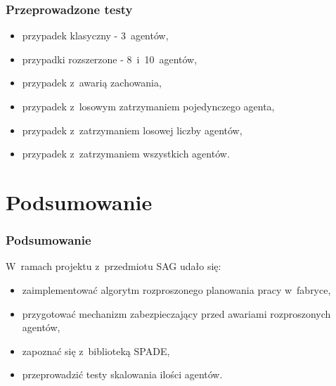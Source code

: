 \documentclass{beamer}
\begin{document}
\begin{frame}
    \frametitle{Przeprowadzone testy}
    \begin{itemize}
        \item przypadek klasyczny - 3~agentów,
        \item przypadki rozszerzone - 8~i~10~agentów,
        \item przypadek z~awarią zachowania,
        \item przypadek z~losowym zatrzymaniem pojedynczego agenta,
        \item przypadek z~zatrzymaniem losowej liczby agentów,
        \item przypadek z~zatrzymaniem wszystkich agentów.
    \end{itemize}
\end{frame}

\section{Podsumowanie}
\begin{frame}
    \frametitle{Podsumowanie}
    W~ramach projektu z~przedmiotu SAG udało się:
    \begin{itemize}
        \item zaimplementować algorytm rozproszonego planowania pracy w~fabryce,
        \item przygotować mechanizm zabezpieczający przed awariami rozproszonych agentów,
        \item zapoznać się z~biblioteką SPADE,
        \item przeprowadzić testy skalowania ilości agentów.
    \end{itemize}
\end{frame}
\end{document}
